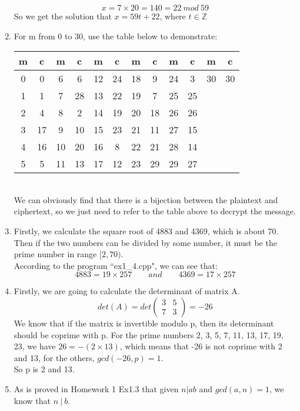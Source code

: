 \documentclass[12pt, a4paper]{article}
\begin{document}
\begin{enumerate}
          $$x = 7\times 20 = 140 = 22\ mod\ 59$$
          So we get the solution that $x = 59t + 22$, where $t\in \mathbb{Z}$
    \item For m from 0 to 30, use the table below to demonstrate:\\
          \begin{tabular}{cc|cc|cc|cc|cc|cc}
            m & c & m & c & m & c & m & c & m & c & m & c\\
            \hline
            0 & 0 & 6 & 6 & 12 & 24 & 18 & 9 & 24 & 3 & 30 & 30\\
            1 & 1 & 7 & 28 & 13 & 22 & 19 & 7 & 25 & 25\\
            2 & 4 & 8 & 2 & 14 & 19 & 20 & 18 & 26 & 26\\
            3 & 17 & 9 & 10 & 15 & 23 & 21 & 11 & 27 & 15\\
            4 & 16 & 10 & 20 & 16 & 8 & 22 & 21 & 28 & 14\\
            5 & 5 & 11 & 13 & 17 & 12 & 23 & 29 & 29 & 27
          \end{tabular}\\
          We can obviously find that there is a  bijection between the plaintext and ciphertext,
          so we just need to refer to the table above to decrypt the message.
    \item Firstly, we calculate the square root of 4883 and 4369, which is about 70.
          Then if the two numbers can be divided by some number, it must be the prime number in range $[2, 70)$.\\
          According to the program ``ex1\_4.cpp", we can see that:
          $$4883 = 19\times 257 \qquad and \qquad 4369 = 17\times 257$$
    \item Firstly, we are going to calculate the determinant of matrix A.\newline
          $$det(A) = det\begin{pmatrix} 3 & 5\\ 7 & 3\end{pmatrix} = -26$$
          We know that if the matrix is invertible modulo p, then its determinant should be coprime with p.
          For the prime numbers 2, 3, 5, 7, 11, 13, 17, 19, 23, we have $26 = -(2\times 13)$, 
          which means that -26 is not coprime with 2 and 13, for the others, $gcd(-26, p) = 1$.\\
          So p is 2 and 13.
    \item As is proved in Homework 1 Ex1.3 that given $n|ab$ and $gcd(a, n) = 1$, we know that $n\ |\ b$.

\end{enumerate}
\end{document}

